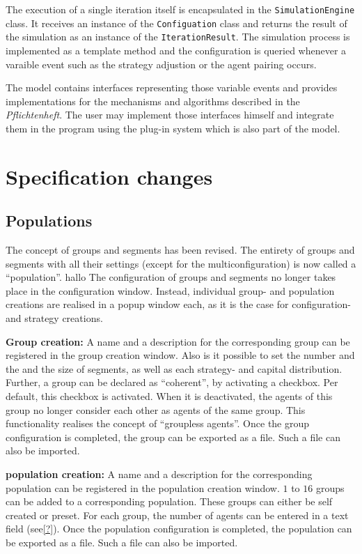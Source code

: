 \documentclass[parskip=full,11pt]{scrartcl}
\begin{document}
The execution of a single iteration itself is encapsulated in the \texttt{SimulationEngine} class. It receives an instance of the \texttt{Configuation} class and returns the result of the simulation as an instance of the \texttt{IterationResult}. The simulation process is implemented as a template method and the configuration is queried whenever a varaible event such as the strategy adjustion or the agent pairing occurs.

The model contains interfaces representing those variable events and provides implementations for the mechanisms and algorithms described in the \textit{Pflichtenheft}. The user may implement those interfaces himself and integrate them in the program using the plug-in system which is also part of the model.

\section{Specification changes}

\subsection{Populations}
The concept of groups and segments has been revised. The entirety of groups and segments with all their settings (except for the multiconfiguration) is now called a \enquote{population}. 
hallo
The configuration of groups and segments no longer takes place in the configuration window. Instead, individual group- and population creations are realised in a popup window each, as it is the case for configuration- and strategy creations.

\textbf{Group creation:}
A name and a description for the corresponding group can be registered in the group creation window. Also is it possible to set the number and the and the size of segments, as well as each strategy- and capital distribution. Further, a group can be declared as \enquote{coherent}, by activating a checkbox. Per default, this checkbox is activated. When it is deactivated, the agents of this group no longer consider each other as agents of the same group. This functionality realises the concept of \enquote{groupless agents}. Once the group configuration is completed, the group can be exported as a file. Such a file can also be imported.

\textbf{population creation:}
A name and a description for the corresponding population can be registered in the population creation window. \(1\) to \(16\) groups can be added to a corresponding population. These groups can either be self created or preset. For each group, the number of agents can be entered in a text field (see\cref{?}). Once the population configuration is completed, the population can be exported as a file. Such a file can also be imported.
\end{document}
